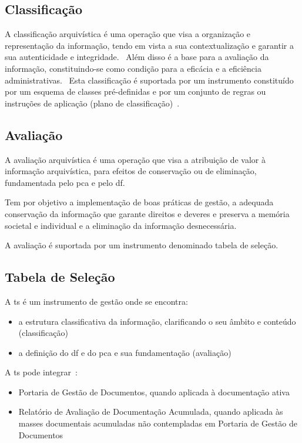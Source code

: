 \subsection{Classificação}

A classificação arquivística é uma operação que visa a organização e representação da informação, tendo em vista a sua contextualização e garantir a sua autenticidade e integridade.~\cite{clavClass} Além disso é a base para a avaliação da informação, constituindo-se como condição para a eficácia e a eficiência administrativas.~\cite{clavClass} Esta classificação é suportada por um instrumento constituído por um esquema de classes pré-definidas e por um conjunto de regras ou instruções de aplicação (plano de classificação)~\cite{clavClass}.

\subsection{Avaliação}

A avaliação arquivística é uma operação que visa a atribuição de valor à informação arquivística, para efeitos de conservação ou de eliminação, fundamentada pelo \acrshort{pca} e pelo \acrshort{df}.~\cite{clavClass}

Tem por objetivo a implementação de boas práticas de gestão, a adequada conservação da informação que garante direitos e deveres e preserva a memória societal e individual e a eliminação da informação desnecessária.~\cite{clavClass}

A avaliação é suportada por um instrumento denominado tabela de seleção.

\subsection{Tabela de Seleção}

A \acrfull{ts} é um instrumento de gestão onde se encontra:~\cite{tsDef}
\begin{itemize}
    \item a estrutura classificativa da informação, clarificando o seu âmbito e conteúdo (classificação)
    \item a definição do \acrlong{df} e do \acrlong{pca} e sua fundamentação (avaliação)
\end{itemize}

A \acrshort{ts} pode integrar~\cite{tsDef}:
\begin{itemize}
    \item Portaria de Gestão de Documentos, quando aplicada à documentação ativa
    \item Relatório  de  Avaliação  de  Documentação  Acumulada, quando aplicada às masses documentais acumuladas não contempladas em Portaria de Gestão de Documentos
\end{itemize}

